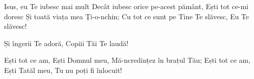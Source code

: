 \beginverse
Isus, eu Te iubesc mai mult
Decât iubesc orice pe-acest pământ,
Ești tot ce-mi doresc
Și toată viața mea Ți-o-nchin;
Cu tot ce sunt pe Tine Te slăvesc,
Eu Te slăvesc!
\endverse

\beginchorus
Și îngerii Te adoră,
Copiii Tăi Te laudă!
\endchorus

\beginverse
Ești tot ce am,
Ești Domnul meu,
Mă-ncredințez în brațul Tău;
Ești tot ce am,
Ești Tatăl meu,
Tu nu poți fi înlocuit!
\endverse
\endsong